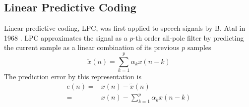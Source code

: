 \subsection{Linear Predictive Coding} %
\label{sub:linear_predictive_coding}
Linear predictive coding, LPC, was first applied to speech signals by B. Atal \etal in 1968 \cite{atal68}. LPC approximates the signal as a $p$-th order all-pole filter by predicting the current sample as a linear combination of its previous $p$ samples \cite{digsig}
\begin{equation}
	\tilde{x}(n) = \sum_{k=1}^{p}\alpha_k x(n-k)
\end{equation}
The prediction error by this representation is 
\begin{equation}
	\begin{split}
		e(n)= & x(n)-\tilde{x}(n) \\
		= & x(n)-\sum_{k=1}^{p}\alpha_k x(n-k)
	\end{split}
\end{equation}

